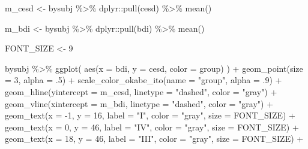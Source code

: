 \documentclass[
  10pt,
  italian,
  a4paper,
  extrafontsizes,onecolumn,openright
  ]{memoir}
\newenvironment{Shaded}{\begin{snugshade}}{\end{snugshade}}
\newcommand{\AttributeTok}[1]{\textcolor[rgb]{0.77,0.63,0.00}{#1}}
\newcommand{\DecValTok}[1]{\textcolor[rgb]{0.00,0.00,0.81}{#1}}
\newcommand{\FunctionTok}[1]{\textcolor[rgb]{0.00,0.00,0.00}{#1}}
\newcommand{\NormalTok}[1]{#1}
\newcommand{\OtherTok}[1]{\textcolor[rgb]{0.56,0.35,0.01}{#1}}
\newcommand{\SpecialCharTok}[1]{\textcolor[rgb]{0.00,0.00,0.00}{#1}}
\newcommand{\StringTok}[1]{\textcolor[rgb]{0.31,0.60,0.02}{#1}}
\theoremstyle{definition}
\theoremstyle{definition}
\theoremstyle{definition}
\theoremstyle{definition}
\theoremstyle{remark}
\begin{document}
\begin{Shaded}
\begin{Highlighting}[]

\NormalTok{m\_cesd }\OtherTok{\textless{}{-}}\NormalTok{ bysubj }\SpecialCharTok{\%\textgreater{}\%} 
\NormalTok{  dplyr}\SpecialCharTok{::}\FunctionTok{pull}\NormalTok{(cesd) }\SpecialCharTok{\%\textgreater{}\%} 
  \FunctionTok{mean}\NormalTok{()}

\NormalTok{m\_bdi }\OtherTok{\textless{}{-}}\NormalTok{ bysubj }\SpecialCharTok{\%\textgreater{}\%} 
\NormalTok{  dplyr}\SpecialCharTok{::}\FunctionTok{pull}\NormalTok{(bdi) }\SpecialCharTok{\%\textgreater{}\%} 
  \FunctionTok{mean}\NormalTok{()}

\NormalTok{FONT\_SIZE }\OtherTok{\textless{}{-}} \DecValTok{9}

\NormalTok{bysubj }\SpecialCharTok{\%\textgreater{}\%}
  \FunctionTok{ggplot}\NormalTok{(}
    \FunctionTok{aes}\NormalTok{(}\AttributeTok{x =}\NormalTok{ bdi, }\AttributeTok{y =}\NormalTok{ cesd, }\AttributeTok{color =}\NormalTok{ group)}
\NormalTok{  ) }\SpecialCharTok{+}
  \FunctionTok{geom\_point}\NormalTok{(}\AttributeTok{size =} \DecValTok{3}\NormalTok{, }\AttributeTok{alpha =}\NormalTok{ .}\DecValTok{5}\NormalTok{) }\SpecialCharTok{+}
  \FunctionTok{scale\_color\_okabe\_ito}\NormalTok{(}\AttributeTok{name =} \StringTok{"group"}\NormalTok{, }\AttributeTok{alpha =}\NormalTok{ .}\DecValTok{9}\NormalTok{) }\SpecialCharTok{+}
  \FunctionTok{geom\_hline}\NormalTok{(}\AttributeTok{yintercept =}\NormalTok{ m\_cesd, }\AttributeTok{linetype =} \StringTok{"dashed"}\NormalTok{, }\AttributeTok{color =} \StringTok{"gray"}\NormalTok{) }\SpecialCharTok{+}
  \FunctionTok{geom\_vline}\NormalTok{(}\AttributeTok{xintercept =}\NormalTok{ m\_bdi, }\AttributeTok{linetype =} \StringTok{"dashed"}\NormalTok{, }\AttributeTok{color =} \StringTok{"gray"}\NormalTok{) }\SpecialCharTok{+}
  \FunctionTok{geom\_text}\NormalTok{(}\AttributeTok{x =} \SpecialCharTok{{-}}\DecValTok{1}\NormalTok{, }\AttributeTok{y =} \DecValTok{16}\NormalTok{, }\AttributeTok{label =} \StringTok{"I"}\NormalTok{, }\AttributeTok{color =} \StringTok{"gray"}\NormalTok{, }\AttributeTok{size =}\NormalTok{ FONT\_SIZE) }\SpecialCharTok{+}
  \FunctionTok{geom\_text}\NormalTok{(}\AttributeTok{x =} \DecValTok{0}\NormalTok{, }\AttributeTok{y =} \DecValTok{46}\NormalTok{, }\AttributeTok{label =} \StringTok{"IV"}\NormalTok{, }\AttributeTok{color =} \StringTok{"gray"}\NormalTok{, }\AttributeTok{size =}\NormalTok{ FONT\_SIZE) }\SpecialCharTok{+}
  \FunctionTok{geom\_text}\NormalTok{(}\AttributeTok{x =} \DecValTok{18}\NormalTok{, }\AttributeTok{y =} \DecValTok{46}\NormalTok{, }\AttributeTok{label =} \StringTok{"III"}\NormalTok{, }\AttributeTok{color =} \StringTok{"gray"}\NormalTok{, }\AttributeTok{size =}\NormalTok{ FONT\_SIZE) }\SpecialCharTok{+}

\end{Highlighting}
\end{Shaded}
\end{document}
